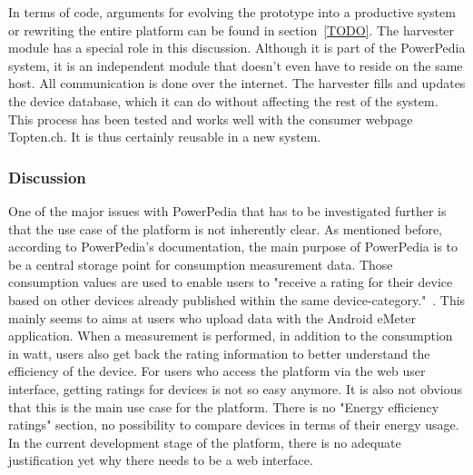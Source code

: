 In terms of code, arguments for evolving the prototype into a productive system or rewriting the entire platform can be found in section~\ref{TODO}. 
The harvester module has a special role in this discussion. Although it is part of the PowerPedia system, it is an independent module that doesn't even have to reside on the same host. All communication is done over the internet. The harvester fills and updates the device database, which it can do without affecting the rest of the system. This process has been tested and works well with the consumer webpage Topten.ch. It is thus certainly reusable in a new system.   

\subsubsection{Discussion}
One of the major issues with PowerPedia that has to be investigated further is that the use case of the platform is not inherently clear. As mentioned before, according to PowerPedia's documentation, the main purpose of PowerPedia is to be a central storage point for consumption measurement data. Those consumption values are used to enable users to "receive a rating for their device based on other devices already published within the same device-category."~\cite{merklepp}. This mainly seems to aims at users who upload data with the Android eMeter application. When a measurement is performed, in addition to the consumption in watt, users also get back the rating information to better understand the efficiency of the device. 
For users who access the platform via the web user interface, getting ratings for devices is not so easy anymore. It is also not obvious that this is the main use case for the platform. There is no "Energy efficiency ratings" section, no possibility to compare devices in terms of their energy usage. In the current development stage of the platform, there is no adequate justification yet why there needs to be a web interface.

